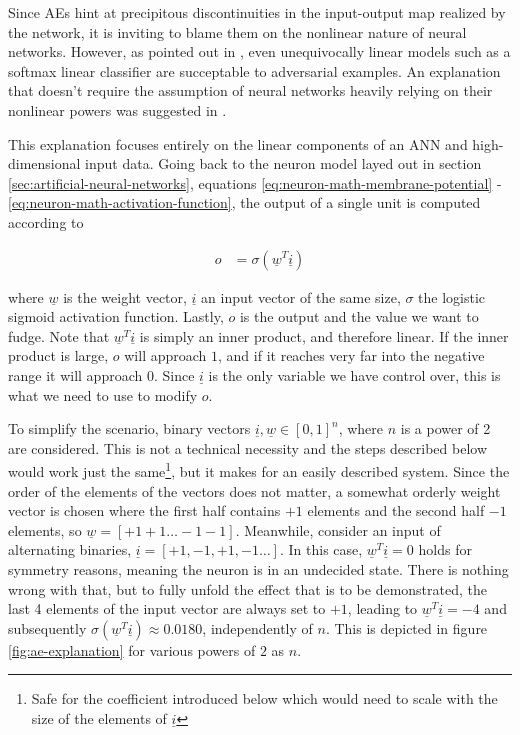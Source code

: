\documentclass[11pt, a4paper]{article}
\newcommand\braces[1]{\left(#1\right)}
\newcommand\brackets[1]{\left[#1\right]}
\renewcommand{\vec}[1]{\underline{#1}}
\begin{document}
Since AEs hint at precipitous discontinuities in the input-output map realized by the network, it is inviting to blame them on the nonlinear nature of neural networks. However, as pointed out in \cite{breaking-linear-classifiers-on-imgagenet}, even unequivocally linear models such as a softmax linear classifier are succeptable to adversarial examples. An explanation that doesn't require the assumption of neural networks heavily relying on their nonlinear powers was suggested in \cite{explaining-and-harnessing-adversarial-examples}.

This explanation focuses entirely on the linear components of an ANN and high-dimensional input data. Going back to the neuron model layed out in section \ref{sec:artificial-neural-networks}, equations \eqref{eq:neuron-math-membrane-potential} - \eqref{eq:neuron-math-activation-function}, the output of a single unit is computed according to

\begin{align}
	o &= \sigma \braces{\vec{w}^T \vec{i}}
\end{align}

where $\vec{w}$ is the weight vector, $\vec{i}$ an input vector of the same size, $\sigma$ the logistic sigmoid activation function. Lastly, $o$ is the output and the value we want to fudge. Note that $\vec{w}^T \vec{i}$ is simply an inner product, and therefore linear. If the inner product is large, $o$ will approach $1$, and if it reaches very far into the negative range it will approach $0$. Since $\vec{i}$ is the only variable we have control over, this is what we need to use to modify $o$.

To simplify the scenario, binary vectors $\vec{i}, \vec{w} \in \brackets{0,1}^n$, where $n$ is a power of 2 are considered. This is not a technical necessity and the steps described below would work just the same\footnote{Safe for the coefficient introduced below which would need to scale with the size of the elements of $\vec{i}$}, but it makes for an easily described system. Since the order of the elements of the vectors does not matter, a somewhat orderly weight vector is chosen where the first half contains $+1$ elements and the second half $-1$ elements, so $\vec{w} = \brackets{+1 +1 \dots -1 -1}$. Meanwhile, consider an input of alternating binaries, $\vec{i} = \brackets{+1, -1, +1, -1 \dots}$. In this case, $\vec{w}^T \vec{i} = 0$ holds for symmetry reasons, meaning the neuron is in an undecided state. There is nothing wrong with that, but to fully unfold the effect that is to be demonstrated, the last 4 elements of the input vector are always set to $+1$, leading to $\vec{w}^T \vec{i} = -4$ and subsequently $\sigma \braces{\vec{w}^T \vec{i}} \approx 0.0180$, independently of $n$. This is depicted in figure \ref{fig:ae-explanation} for various powers of $2$ as $n$.
\end{document}
